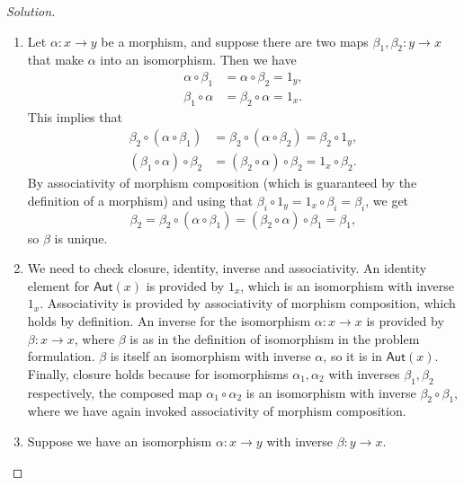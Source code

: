 \begin{proof}[Solution]
\hfill
\begin{enumerate}[font=\normalfont,label=\textbf{(\alph*)}, wide]
\item Let $\alpha: x\to y$ be a morphism, and suppose there are two maps $\beta_1, \beta_2: y \to x$ that make $\alpha$ into an isomorphism. Then we have
\[
\begin{aligned}
\alpha \circ \beta_1 &= \alpha \circ \beta_2 = 1_y, \\
 \beta_1  \circ \alpha&= \beta_2 \circ \alpha  = 1_x.
\end{aligned}
\]
This implies that
\[
\begin{aligned}
\beta_2 \circ ( \alpha \circ \beta_1) &= \beta_2 \circ ( \alpha \circ \beta_2) = \beta_2 \circ 1_y, \\
(\beta_1  \circ \alpha) \circ \beta_2 &= (\beta_2 \circ \alpha) \circ \beta_2  = 1_x \circ \beta_2.
\end{aligned}
\]
By associativity of morphism composition (which is guaranteed by the definition of a morphism) and using that $\beta_i \circ 1_y = 1_x \circ \beta_i = \beta_i$, we get
\[
\beta_2 = \beta_2 \circ( \alpha \circ \beta_1) =  (\beta_2 \circ \alpha) \circ \beta_1 = \beta_1, 
\]
so $\beta$ is unique.

\item We need to check closure, identity, inverse and associativity. An identity element for $\mathsf{Aut}(x)$ is provided by $1_x$, which is an isomorphism with inverse $1_x$. Associativity is provided by associativity of morphism composition, which holds by definition. An inverse for the isomorphism $\alpha: x \to x$ is provided by $\beta: x \to x$, where $\beta$ is as in the definition of isomorphism in the problem formulation. $\beta$ is itself an isomorphism with inverse $\alpha$, so it is in $\mathsf{Aut}(x)$. Finally, closure holds because for isomorphisms $\alpha_1, \alpha_2$ with inverses $\beta_1, \beta_2$ respectively, the composed map $\alpha_1 \circ \alpha_2$ is an isomorphism with inverse $\beta_2 \circ \beta_1$, where we have again invoked associativity of morphism composition.


\item Suppose we have an isomorphism $\alpha: x \to y$ with inverse $\beta: y \to x$. 
\end{enumerate}
\end{proof}




